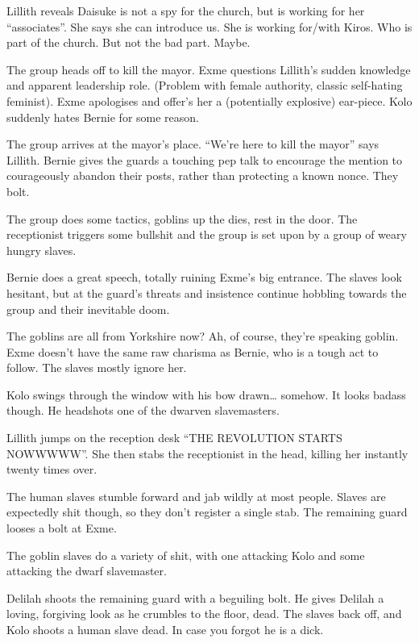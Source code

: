 Lillith reveals Daisuke is not a spy for the church, but is working for her “associates”. She says she can introduce us. She is working for/with Kiros. Who is part of the church. But not the bad part. Maybe.\medskip

The group heads off to kill the mayor. Exme questions Lillith’s sudden knowledge and apparent leadership role. (Problem with female authority, classic self-hating feminist). Exme apologises and offer’s her a (potentially explosive) ear-piece. Kolo suddenly hates Bernie for some reason.\medskip

The group arrives at the mayor’s place. “We’re here to kill the mayor” says Lillith. Bernie gives the guards a touching pep talk to encourage the mention to courageously abandon their posts, rather than protecting a known nonce. They bolt.\medskip

The group does some tactics, goblins up the dies, rest in the door. The receptionist triggers some bullshit and the group is set upon by a group of weary hungry slaves.\medskip

Bernie does a great speech, totally ruining Exme’s big entrance. The slaves look hesitant, but at the guard’s threats and insistence continue hobbling towards the group and their inevitable doom.\medskip

The goblins are all from Yorkshire now? Ah, of course, they’re speaking goblin. Exme doesn’t have the same raw charisma as Bernie, who is a tough act to follow. The slaves mostly ignore her.\medskip

Kolo swings through the window with his bow drawn… somehow. It looks badass though. He headshots one of the dwarven slavemasters.\medskip

Lillith jumps on the reception desk “THE REVOLUTION STARTS NOWWWWW”. She then stabs the receptionist in the head, killing her instantly twenty times over.\medskip

The human slaves stumble forward and jab wildly at most people. Slaves are expectedly shit though, so they don’t register a single stab. The remaining guard looses a bolt at Exme.\medskip

The goblin slaves do a variety of shit, with one attacking Kolo and some attacking the dwarf slavemaster.\medskip

Delilah shoots the remaining guard with a beguiling bolt. He gives Delilah a loving, forgiving look as he crumbles to the floor, dead. The slaves back off, and Kolo shoots a human slave dead. In case you forgot he is a dick.\medskip

